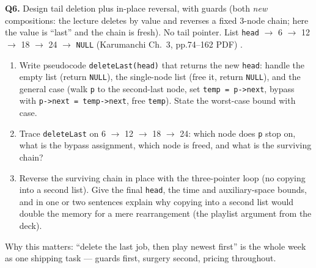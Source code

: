 \documentclass[11pt]{article}
\begin{document}
\textbf{Q6.} Design tail deletion plus in-place reversal, with guards (both \emph{new} compositions: the lecture deletes by value and reverses a fixed 3-node chain; here the value is ``last'' and the chain is fresh). No tail pointer. List \texttt{head} $\to$ 6 $\to$ 12 $\to$ 18 $\to$ 24 $\to$ \texttt{NULL} (Karumanchi Ch.~3, pp.74--162 PDF) \cite{Karumanchi2017_data_structures_algorithms_made_easy}.
\begin{enumerate}
  \item[(a)] Write pseudocode \texttt{deleteLast(head)} that returns the new \texttt{head}: handle the empty list (return \texttt{NULL}), the single-node list (free it, return \texttt{NULL}), and the general case (walk \texttt{p} to the second-last node, set \texttt{temp = p->next}, bypass with \texttt{p->next = temp->next}, free \texttt{temp}). State the worst-case bound with case.
  \item[(b)] Trace \texttt{deleteLast} on 6 $\to$ 12 $\to$ 18 $\to$ 24: which node does \texttt{p} stop on, what is the bypass assignment, which node is freed, and what is the surviving chain?
  \item[(c)] Reverse the surviving chain in place with the three-pointer loop (no copying into a second list). Give the final \texttt{head}, the time and auxiliary-space bounds, and in one or two sentences explain why copying into a second list would double the memory for a mere rearrangement (the playlist argument from the deck).
\end{enumerate}
Why this matters: ``delete the last job, then play newest first'' is the whole week as one shipping task --- guards first, surgery second, pricing throughout.



\end{document}
